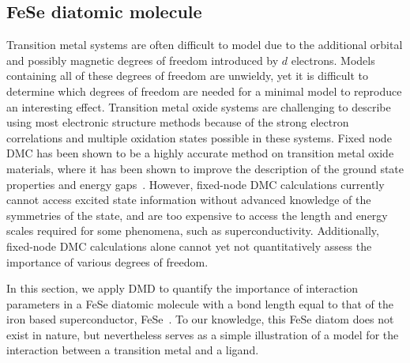 \subsection{FeSe diatomic molecule}
\label{subsection:fese}
Transition metal systems are often difficult to model due to the additional orbital and possibly magnetic degrees of freedom introduced by $d$ electrons.
Models containing all of these degrees of freedom are unwieldy, yet it is difficult to determine which degrees of freedom are needed for a minimal model to reproduce an interesting effect.
Transition metal oxide systems are challenging to describe using most electronic structure methods because of the strong electron correlations and multiple oxidation states possible in these systems. 
Fixed node DMC has been shown to be a highly accurate method on transition metal oxide materials, where it has been shown to improve the description of the ground state properties and energy gaps~\cite{Foyevtsova2014, Wagner_Abbamonte, Zheng2015, Wagner2016}. %
\BDB{This sentence might be unnecessary:[[[}
However, fixed-node DMC calculations currently cannot access excited state information without advanced knowledge of the symmetries of the state, and are too expensive to access the length and energy scales required for some phenomena, such as superconductivity. 
\BDB{]]]}
Additionally, fixed-node DMC calculations alone cannot yet not quantitatively assess the importance of various degrees of freedom. 

In this section, we apply DMD to quantify the importance of interaction parameters in a FeSe diatomic molecule with a bond length equal to that of the iron based superconductor, FeSe~\cite{kumar_crystal_2010}.
To our knowledge, this FeSe diatom does not exist in nature, but nevertheless serves as a simple illustration of a model for the interaction between a transition metal and a ligand. 

